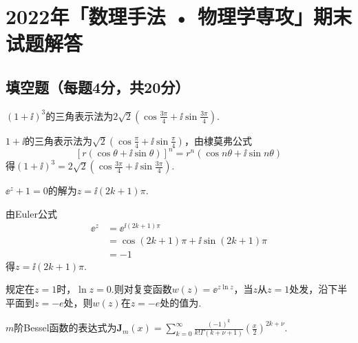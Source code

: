 \chapter{2022年「数理手法 • 物理学専攻」期末试题解答}
\section{填空题（每题4分，共20分）}
{
\vspace{-1em}
\begin{exercise}
    $\left(1+\ii\right)^3$的三角表示法为\underline{$2\sqrt{2}\left(\cos{\frac{3\pi}{4}+\ii\sin{\frac{3\pi}{4}}}\right)$}.
\end{exercise}
\begin{solution}
    $1+\ii$的三角表示法为$\sqrt{2}\left(\cos{\frac{\pi}{4}+\ii\sin{\frac{\pi}{4}}}\right)$，由棣莫弗公式
    $$\left[r\left(\cos{\theta}+\ii\sin{\theta}\right)\right]^n=r^n\left(\cos{n\theta}+\ii\sin{n\theta}\right)$$
    得$\left(1+\ii\right)^3=2\sqrt{2}\left(\cos{\frac{3\pi}{4}+\ii\sin{\frac{3\pi}{4}}}\right)$.
\end{solution}
\begin{exercise}
    $\ee^z+1=0$的解为\underline{$z=\ii\left(2k+1\right)\pi$}.
\end{exercise}
\begin{solution}
    由Euler公式
    $$
    \begin{aligned}
    \ee^z&=\ee^{\ii\left(2k+1\right)\pi}\\
    &=\cos{\left(2k+1\right)\pi}+\ii\sin{\left(2k+1\right)\pi}\\
    &=-1
    \end{aligned}
    $$
    得$z=\ii\left(2k+1\right)\pi$.
\end{solution}

\begin{exercise}
    规定在$z=1$时，$\ln{z}=0$.则对复变函数$w\left(z\right)=\ee^{z\ln{z}}$，当$z$从$z=1$处发，沿下半平面到$z=-e$处，则$w\left(z\right)$在$z=-e$处的值为\underline{}.
\end{exercise}
\begin{solution}
    
\end{solution}

\begin{exercise}
    $m$阶Bessel函数的表达式为\underline{$\mathbf{J}_m\left(x\right)=\sum_{k=0}^{\infty}{\frac{\left(-1\right)^k}{k!\Gamma\left(k+\nu+1\right)}\left(\frac{x}{2}\right)^{2k+\nu}}$}.
\end{exercise}

}

